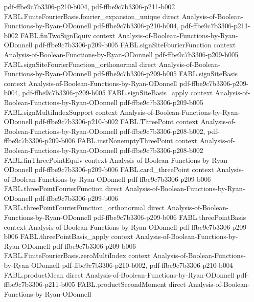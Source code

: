 \begin{theorem}
  {pdf-ffbe9c7b3306-p210-b004,
    pdf-ffbe9c7b3306-p211-b002}
\proofstep
  {FABL.FiniteFourierBasis.fourier_expansion_unique}
  {direct}
  {Analysis-of-Boolean-Functions-by-Ryan-ODonnell}
  {pdf-ffbe9c7b3306-p210-b004,
    pdf-ffbe9c7b3306-p211-b002}
\proofstep
  {FABL.finTwoSignEquiv}
  {context}
  {Analysis-of-Boolean-Functions-by-Ryan-ODonnell}
  {pdf-ffbe9c7b3306-p209-b005}
\proofstep
  {FABL.signSiteFourierFunction}
  {context}
  {Analysis-of-Boolean-Functions-by-Ryan-ODonnell}
  {pdf-ffbe9c7b3306-p209-b005}
\proofstep
  {FABL.signSiteFourierFunction_orthonormal}
  {direct}
  {Analysis-of-Boolean-Functions-by-Ryan-ODonnell}
  {pdf-ffbe9c7b3306-p209-b005}
\proofstep
  {FABL.signSiteBasis}
  {context}
  {Analysis-of-Boolean-Functions-by-Ryan-ODonnell}
  {pdf-ffbe9c7b3306-p209-b004,
    pdf-ffbe9c7b3306-p209-b005}
\proofstep
  {FABL.signSiteBasis_apply}
  {context}
  {Analysis-of-Boolean-Functions-by-Ryan-ODonnell}
  {pdf-ffbe9c7b3306-p209-b005}
\proofstep
  {FABL.signMultiIndexSupport}
  {context}
  {Analysis-of-Boolean-Functions-by-Ryan-ODonnell}
  {pdf-ffbe9c7b3306-p210-b002}
\proofstep
  {FABL.ThreePoint}
  {context}
  {Analysis-of-Boolean-Functions-by-Ryan-ODonnell}
  {pdf-ffbe9c7b3306-p208-b002,
    pdf-ffbe9c7b3306-p209-b006}
\proofstep
  {FABL.instNonemptyThreePoint}
  {context}
  {Analysis-of-Boolean-Functions-by-Ryan-ODonnell}
  {pdf-ffbe9c7b3306-p208-b002}
\proofstep
  {FABL.finThreePointEquiv}
  {context}
  {Analysis-of-Boolean-Functions-by-Ryan-ODonnell}
  {pdf-ffbe9c7b3306-p209-b006}
\proofstep
  {FABL.card_threePoint}
  {context}
  {Analysis-of-Boolean-Functions-by-Ryan-ODonnell}
  {pdf-ffbe9c7b3306-p209-b006}
\proofstep
  {FABL.threePointFourierFunction}
  {direct}
  {Analysis-of-Boolean-Functions-by-Ryan-ODonnell}
  {pdf-ffbe9c7b3306-p209-b006}
\proofstep
  {FABL.threePointFourierFunction_orthonormal}
  {direct}
  {Analysis-of-Boolean-Functions-by-Ryan-ODonnell}
  {pdf-ffbe9c7b3306-p209-b006}
\proofstep
  {FABL.threePointBasis}
  {context}
  {Analysis-of-Boolean-Functions-by-Ryan-ODonnell}
  {pdf-ffbe9c7b3306-p209-b006}
\proofstep
  {FABL.threePointBasis_apply}
  {context}
  {Analysis-of-Boolean-Functions-by-Ryan-ODonnell}
  {pdf-ffbe9c7b3306-p209-b006}
\proofstep
  {FABL.FiniteFourierBasis.zeroMultiIndex}
  {context}
  {Analysis-of-Boolean-Functions-by-Ryan-ODonnell}
  {pdf-ffbe9c7b3306-p210-b002,
    pdf-ffbe9c7b3306-p210-b004}
\proofstep
  {FABL.productMean}
  {direct}
  {Analysis-of-Boolean-Functions-by-Ryan-ODonnell}
  {pdf-ffbe9c7b3306-p211-b005}
\proofstep
  {FABL.productSecondMoment}
  {direct}
  {Analysis-of-Boolean-Functions-by-Ryan-ODonnell}

\end{theorem}
